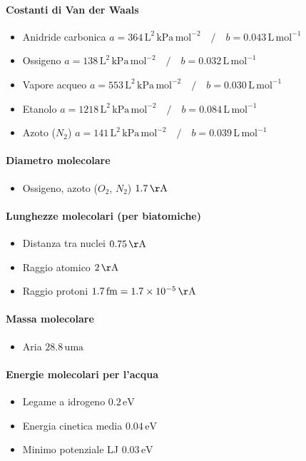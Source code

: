 \documentclass[10pt, oneside]{book}
\begin{document}
\paragraph{Costanti di Van der Waals}
\begin{itemize}
\item Anidride carbonica \dotfill $a = 364 \, \mathrm{L^2 \, kPa \, mol^{-2}} \quad \big/ \quad b = 0.043 \, \mathrm{L \, mol^{-1}}$ 
\item Ossigeno \dotfill $a = 138 \, \mathrm{L^2 \, kPa \, mol^{-2}} \quad \big/ \quad b = 0.032 \, \mathrm{L \, mol^{-1}}$ 
\item Vapore acqueo \dotfill $a = 553 \, \mathrm{L^2 \, kPa \, mol^{-2}} \quad \big/ \quad b = 0.030 \, \mathrm{L \, mol^{-1}}$ 
\item Etanolo \dotfill $a = 1218 \, \mathrm{L^2 \, kPa \, mol^{-2}} \quad \big/ \quad b = 0.084 \, \mathrm{L \, mol^{-1}}$ 
\item Azoto ($N_2$) \dotfill $a = 141 \, \mathrm{L^2 \, kPa \, mol^{-2}} \quad \big/ \quad b = 0.039 \, \mathrm{L \, mol^{-1}}$ 
\end{itemize}
\paragraph{Diametro molecolare}
\begin{itemize}
\item Ossigeno, azoto ($O_2$, $N_2$) \dotfill $ 1.7 \, \mathrm{\AA}$ 
\end{itemize}
\paragraph{Lunghezze molecolari (per biatomiche)}
\begin{itemize}
\item Distanza tra nuclei \dotfill $ 0.75 \, \mathrm{\AA}$ 
\item Raggio atomico \dotfill $ 2 \, \mathrm{\AA}$ 
\item Raggio protoni \dotfill $ 1.7 \, \mathrm{fm} = 1.7 \times 10^{-5} \, \mathrm{\AA}$
\end{itemize}
\paragraph{Massa molecolare}
\begin{itemize}
\item Aria \dotfill $ 28.8 \, \mathrm{uma}$
\end{itemize}
\paragraph{Energie molecolari per l'acqua}
\begin{itemize}
\item Legame a idrogeno \dotfill $ 0.2 \, \mathrm{eV}$
\item Energia cinetica media \dotfill $ 0.04 \, \mathrm{eV}$
\item Minimo potenziale LJ \dotfill $ 0.03 \, \mathrm{eV}$

\end{itemize}
\end{document}
